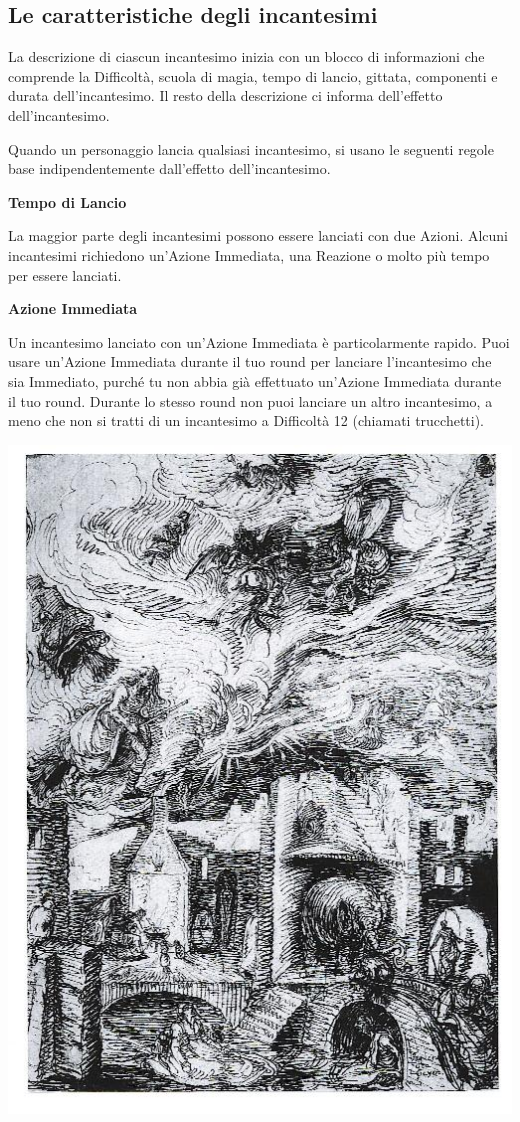 \begin{multicols}{2}
\subsection{Le caratteristiche degli incantesimi}

La descrizione di ciascun incantesimo inizia con un blocco di informazioni che comprende la Difficoltà, scuola di magia, tempo di lancio, gittata, componenti e durata dell'incantesimo. Il resto della descrizione ci informa dell'effetto dell'incantesimo. 

Quando un personaggio lancia qualsiasi incantesimo, si usano le seguenti regole base indipendentemente dall'effetto dell'incantesimo.

\medskip

\textbf{Tempo di Lancio}

La maggior parte degli incantesimi possono essere lanciati con due Azioni. Alcuni incantesimi richiedono un'Azione Immediata, una Reazione o molto più tempo per essere lanciati.

\textbf{Azione Immediata}

Un incantesimo lanciato con un'Azione Immediata è particolarmente rapido. Puoi usare un'Azione Immediata durante il tuo round per lanciare l'incantesimo che sia Immediato, purché tu non abbia già effettuato un'Azione Immediata durante il tuo round. Durante lo stesso round non puoi lanciare un altro incantesimo, a meno che non si tratti di un incantesimo a Difficoltà 12 (chiamati trucchetti).


\includegraphics[width=0.7\linewidth]{immagini/Hex32.jpg}
	

\end{multicols}
